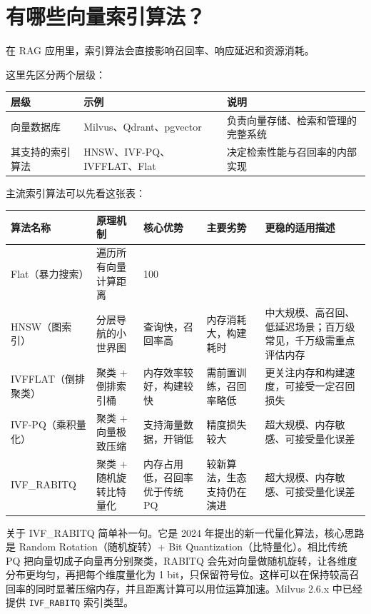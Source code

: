\documentclass[10pt,a4paper]{ctexart}
\begin{document}
\section{有哪些向量索引算法？}


在 RAG 应用里，索引算法会直接影响召回率、响应延迟和资源消耗。



这里先区分两个层级：


{\footnotesize
\begin{tabularx}{\textwidth}{|X|X|X|}
\hline
\textbf{层级} & \textbf{示例} & \textbf{说明} \\
\hline
向量数据库 & Milvus、Qdrant、pgvector & 负责向量存储、检索和管理的完整系统 \\
\hline
其支持的索引算法 & HNSW、IVF-PQ、IVFFLAT、Flat & 决定检索性能与召回率的内部实现 \\
\hline
\end{tabularx}
}



主流索引算法可以先看这张表：


{\footnotesize
\begin{tabularx}{\textwidth}{|X|X|X|X|X|}
\hline
\textbf{算法名称} & \textbf{原理机制} & \textbf{核心优势} & \textbf{主要劣势} & \textbf{更稳的适用描述} \\
\hline
Flat（暴力搜索） & 遍历所有向量计算距离 & 100\\%
\hline
HNSW（图索引） & 分层导航的小世界图 & 查询快，召回率高 & 内存消耗大，构建耗时 & 中大规模、高召回、低延迟场景；百万级常见，千万级需重点评估内存 \\
\hline
IVFFLAT（倒排聚类） & 聚类 + 倒排索引桶 & 内存效率较好，构建较快 & 需前置训练，召回率略低 & 更关注内存和构建速度，可接受一定召回损失 \\
\hline
IVF-PQ（乘积量化） & 聚类 + 向量极致压缩 & 支持海量数据，开销低 & 精度损失较大 & 超大规模、内存敏感、可接受量化误差 \\
\hline
IVF\_RABITQ & 聚类 + 随机旋转比特量化 & 内存占用低，召回率优于传统 PQ & 较新算法，生态支持仍在演进 & 超大规模、内存敏感、可接受量化误差 \\
\hline
\end{tabularx}
}



关于 IVF\_RABITQ 简单补一句。它是 2024 年提出的新一代量化算法，核心思路是 Random Rotation（随机旋转）+ Bit Quantization（比特量化）。相比传统 PQ 把向量切成子向量再分别聚类，RABITQ 会先对向量做随机旋转，让各维度分布更均匀，再把每个维度量化为 1 bit，只保留符号位。这样可以在保持较高召回率的同时显著压缩内存，并且距离计算可以用位运算加速。Milvus 2.6.x 中已经提供 \texttt{IVF\_RABITQ} 索引类型。
\end{document}

